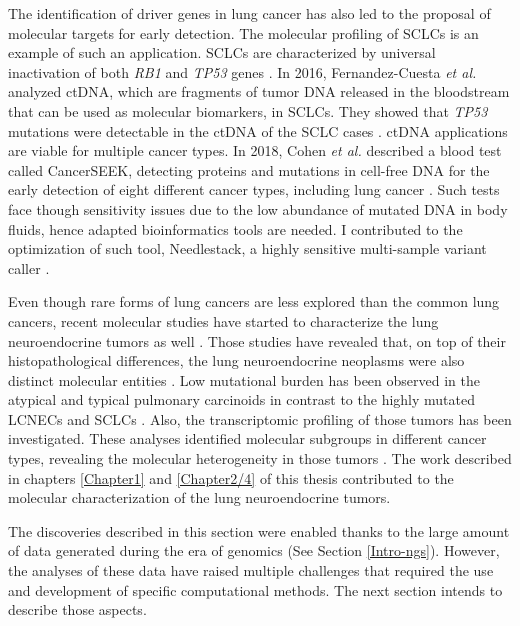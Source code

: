 The identification of driver genes in lung cancer has also led to the proposal of molecular targets for early detection. The molecular profiling of \gls{SCLC}s is an example of such an application. \gls{SCLC}s are characterized by universal inactivation of both \textit{RB1} and \textit{TP53} genes \cite{Peifer2012a,George2015,Fernandez-Cuesta2019}. In 2016, Fernandez-Cuesta \textit{et al.} analyzed \gls{ctDNA}, which are fragments of tumor \gls*{DNA} released in the bloodstream that can be used as molecular biomarkers, in \gls{SCLC}s. They showed that \textit{TP53} mutations were detectable in the \gls{ctDNA} of the \gls{SCLC} cases \cite{Fernandez-cuesta2016}. 
\gls{ctDNA} applications are viable for multiple cancer types. In 2018, Cohen \textit{et al.} described a blood test called CancerSEEK, detecting proteins and mutations in cell-free \gls*{DNA} for the early detection of eight different cancer types, including lung cancer \cite{Cohen2018}. Such tests face though sensitivity issues due to the low abundance of mutated \gls*{DNA} in body fluids, hence adapted bioinformatics tools are needed. I contributed to the optimization of such tool, Needlestack, a highly sensitive multi-sample variant caller \cite{Delhomme2020}. 

Even though rare forms of lung cancers are less explored than the common lung cancers, recent molecular studies have started to characterize the lung neuroendocrine tumors as well \cite{Fernandez-Cuesta2014,George2018,Rekhtman2016,Simbolo2019}. Those studies have revealed that, on top of their histopathological differences, the lung neuroendocrine neoplasms were also distinct molecular entities \cite{Fernandez-Cuesta2019}. Low mutational burden has been observed in the atypical and typical pulmonary carcinoids in contrast to the highly mutated \gls{LCNEC}s and \gls{SCLC}s \cite{Derks2018}. Also, the transcriptomic profiling of those tumors has been investigated. These analyses identified molecular subgroups in different cancer types, revealing the molecular heterogeneity in those tumors \cite{George2018,Rudin2019}. The work described in chapters \ref{Chapter1} and \ref{Chapter2/4} of this thesis contributed to the molecular characterization of the lung neuroendocrine tumors.  \newline


The discoveries described in this section were enabled thanks to the large amount of data generated during the era of genomics (See Section \ref{Intro-ngs}). However, the analyses of these data have raised multiple challenges that required the use and development of specific computational methods. The next section intends to describe those aspects. 